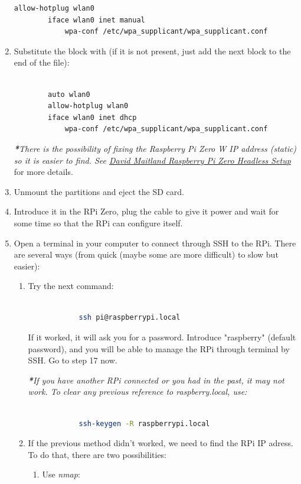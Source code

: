 \documentclass[12pt,a4paper,oneside]{article} %
\begin{document}
\begin{enumerate}
\begin{lstlisting}[language=sh,style=textstyle]
		allow-hotplug wlan0
        iface wlan0 inet manual
            wpa-conf /etc/wpa_supplicant/wpa_supplicant.conf
	\end{lstlisting}
	\item Substitute the block with (if it is not present, just add the next block to the end of the file):
	\begin{lstlisting}[language=sh,style=textstyle]
	
		auto wlan0
        allow-hotplug wlan0
        iface wlan0 inet dhcp
            wpa-conf /etc/wpa_supplicant/wpa_supplicant.conf
	\end{lstlisting}
	\emph{\textbf{*}There is the possibility of fixing the Raspberry Pi Zero W IP address (static) so it is easier to find. See \href{https://medium.com/@DavidMaitland/raspberry-pi-zero-headless-setup-92fb72daf88d}{David Maitland Raspberry Pi Zero Headless Setup}} for more details.
	\item Unmount the partitions and eject the SD card.
	\item Introduce it in the RPi Zero, plug the cable to give it power and wait for some time so that the RPi can configure itself.
	\item Open a terminal in your computer to connect through SSH to the RPi. There are several ways (from quick (maybe some are more difficult) to slow but easier):
	\begin{enumerate}
		\item Try the next command:
		\begin{lstlisting}[language=sh]
	
			ssh pi@raspberrypi.local
		\end{lstlisting}
		If it worked, it will ask you for a password. Introduce "raspberry" (default password), and you will be able to manage the RPi through terminal by SSH. Go to step 17 now.
		
		\emph{\textbf{*}If you have another RPi connected or you had in the past, it may not work. To clear any previous reference to \textit{raspberry.local}, use:}
		\begin{lstlisting}[language=sh]
	
			ssh-keygen -R raspberrypi.local
		\end{lstlisting}
		\item If the previous method didn't worked, we need to find the RPi IP adress. To do that, there are two possibilities:
		\begin{enumerate}
			\item Use \emph{nmap}:
			\begin{lstlisting}[language=sh]
	

\end{lstlisting}
\end{enumerate}
\end{enumerate}
\end{enumerate}
\end{document}
